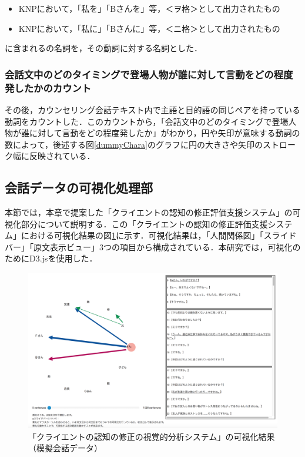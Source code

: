\documentclass[shuuron]{kuee}
\begin{document}
\begin{itemize}

  \item KNPにおいて，「私を」「Bさんを」等，＜ヲ格＞として出力されたもの
  \item KNPにおいて，「私に」「Bさんに」等，＜ニ格＞として出力されたもの
\end{itemize}
に含まれるの名詞を，その動詞に対する名詞とした．

\subsubsection{会話文中のどのタイミングで登場人物が誰に対して言動をどの程度発したかのカウント}

その後，カウンセリング会話テキスト内で主語と目的語の同じペアを持っている動詞をカウントした．このカウントから，「会話文中のどのタイミングで登場人物が誰に対して言動をどの程度発したか」がわかり，円や矢印が意味する動詞の数によって，後述する図\ref{dummyChara}のグラフに円の大きさや矢印のストローク幅に反映されている．


\subsection{会話データの可視化処理部}

本節では，本章で提案した「クライエントの認知の修正評価支援システム」の可視化部分について説明する．この「クライエントの認知の修正評価支援システム」における可視化結果の図\ref{fig:dummyChara}に示す．可視化結果は，「人間関係図」「スライドバー」「原文表示ビュー」3つの項目から構成されている．本研究では，可視化のためにD3.js\cite{vand3}を使用した．%

\begin{figure}
  \begin{center}
    \includegraphics[width=\linewidth]{dummyChara.png}
  \end{center}
  \caption{「クライエントの認知の修正の視覚的分析システム」の可視化結果（模擬会話データ）}
  \label{fig:dummyChara}
\end{figure}
\end{document}
